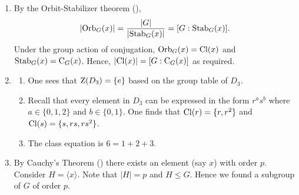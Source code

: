 \begin{enumerate}
	\item By the Orbit-Stabilizer theorem (),
	\[
        |\mathrm{Orb}_{G}(x)| = \frac{|G|}{|\mathrm{Stab}_{G}(x)|} = [G : \mathrm{Stab}_{G}(x)]	.
	\]
	Under the group action of conjugation, $\mathrm{Orb}_{G}(x) = \mathrm{Cl}(x)$ and $\mathrm{Stab}_{G}(x) = \mathrm{C}_{G}(x)$. Hence, $|\mathrm{Cl}(x)| = [G : \mathrm{C}_{G}(x)]	$ as required.

	\item \begin{enumerate}[label=(\alph*)]
	    \item One sees that $\mathrm{Z}(D_3) = \{e\}$ based on the group table of $D_3$.
	    \item Recall that every element in $D_3$ can be expressed in the form $r^as^b$ where $a \in \{0, 1, 2\}$ and $b \in \{0, 1\}$. One finds that $\mathrm{Cl}(r) = \{r, r^2\}$ and $\mathrm{Cl}(s) = \{s, rs, rs^2\}$.
	    \item The class equation is $6 = 1 + 2 + 3$.
	\end{enumerate}

	\item By Cauchy's Theorem () there exists an element (say $x$) with order $p$. Consider $H = \langle x \rangle$. Note that $|H| = p$ and $H \leq G$. Hence we found a subgroup of $G$ of order $p$.
\end{enumerate}

